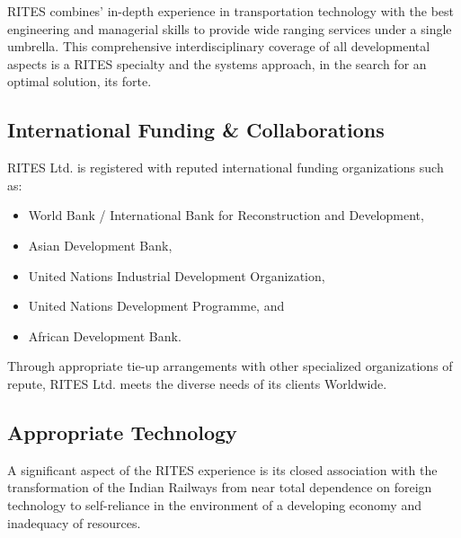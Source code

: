 \bigskip

{\color[rgb]{0.0,0.0,0.039215688}
RITES combines' in-depth experience in transportation technology with the best engineering and managerial skills to
provide wide ranging services under a single umbrella. This comprehensive interdisciplinary coverage of
all developmental aspects is a RITES specialty and the systems approach, in the search for an optimal solution, its
forte.}


\bigskip


\subsection{International Funding \& Collaborations}


\bigskip

{\color[rgb]{0.0,0.0,0.039215688}
RITES Ltd. is registered with reputed international funding organizations such as:}


\bigskip

\begin{itemize}
\item {\color[rgb]{0.0,0.0,0.039215688}
World Bank / International Bank for Reconstruction and Development,}
\item {\color[rgb]{0.0,0.0,0.039215688}
Asian Development Bank,}
\item {\color[rgb]{0.0,0.0,0.039215688}
United Nations Industrial Development Organization,}
\item {\color[rgb]{0.0,0.0,0.039215688}
United Nations Development Programme, and}
\item {\color[rgb]{0.0,0.0,0.039215688}
African Development Bank. }
\end{itemize}

\bigskip

{\color[rgb]{0.0,0.0,0.039215688}
Through appropriate tie-up arrangements with other specialized organizations of repute, RITES Ltd. meets the diverse
needs of its clients Worldwide. }


\bigskip


\subsection{Appropriate Technology}


\bigskip

{\color[rgb]{0.0,0.0,0.039215688}
A significant aspect of the RITES experience is its closed association with the transformation of the Indian Railways
from near total dependence on foreign technology to self-reliance in the environment of a developing economy and
inadequacy of resources.}


